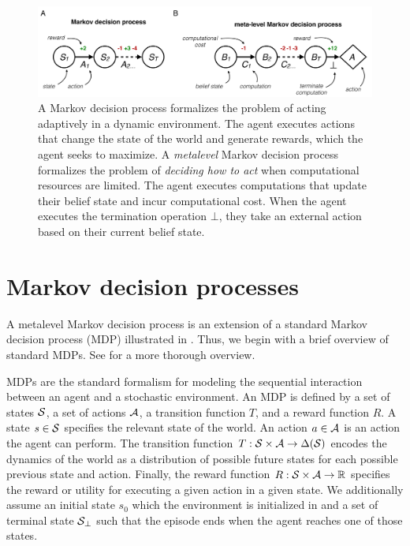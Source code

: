 

\begin{figure}
  \includegraphics[width=\textwidth]{figs/metamdp.pdf}
  \caption{
   A Markov decision process formalizes the problem of acting adaptively in a dynamic environment. The agent executes actions that change the state of the world and generate rewards, which the agent seeks to maximize.
   A \emph{metalevel} Markov decision process formalizes the problem of \emph{deciding how to act} when computational resources are limited. The agent executes computations that update their belief state and incur computational cost. When the agent executes the termination operation $\bot$, they take an external action based on their current belief state.}
  \label{fig:metamdp-diagram}
\end{figure}


\section{Markov decision processes}

A metalevel Markov decision process is an extension of a standard Markov decision process (MDP) illustrated in . Thus, we begin with a brief overview of standard MDPs. See \citet{sutton2018reinforcement} for a more thorough overview.

MDPs are the standard formalism for modeling the sequential interaction between an agent and a stochastic environment. An MDP is defined by a set of states $\S$, a set of actions $\A$, a transition function $T$, and a reward function $R$. A state $s \in \S$ specifies the relevant state of the world. An action $a \in \A$ is an action the agent can perform. The transition function $T: \S \times \A \rightarrow \Delta(\S)$\footnotemark{} encodes the dynamics of the world as a distribution of possible future states for each possible previous state and action. Finally, the reward function $R: \S \times \A \rightarrow \R $ specifies the reward or utility for executing a given action in a given state. We additionally assume an initial state $s_0$ which the environment is initialized in and a set of terminal state $\S_\bot$ such that the episode ends when the agent reaches one of those states.

